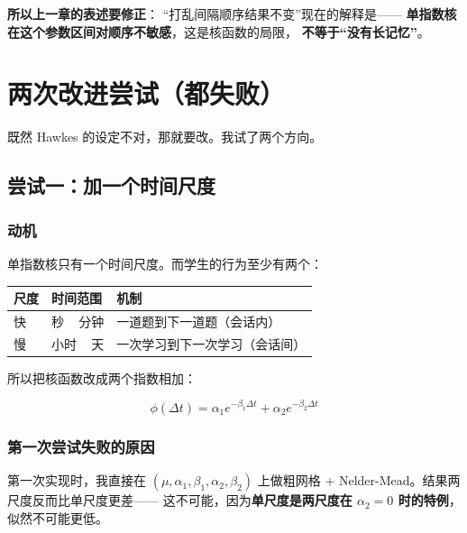 \documentclass[UTF8,a4paper,11pt]{ctexart}
\begin{document}
\textbf{所以上一章的表述要修正}：
“打乱间隔顺序结果不变”现在的解释是——
\textbf{单指数核在这个参数区间对顺序不敏感}，这是核函数的局限，
\textbf{不等于“没有长记忆”}。

\newpage

\section{两次改进尝试（都失败）}

既然 Hawkes 的设定不对，那就要改。我试了两个方向。

\subsection{尝试一：加一个时间尺度}

\subsubsection{动机}

单指数核只有一个时间尺度。而学生的行为至少有两个：

\begin{center}
\begin{tabular}{p{2.2cm}p{3.6cm}p{7.6cm}}
\toprule
\textbf{尺度} & \textbf{时间范围} & \textbf{机制} \\
\midrule
快 & 秒 ~ 分钟 & 一道题到下一道题（会话内） \\
慢 & 小时 ~ 天 & 一次学习到下一次学习（会话间） \\
\bottomrule
\end{tabular}
\end{center}

所以把核函数改成两个指数相加：

\begin{equation}
\phi(\Delta t) = \alpha_1 e^{-\beta_1 \Delta t} + \alpha_2 e^{-\beta_2 \Delta t}
\label{p2:eq:multiscale}
\end{equation}

\subsubsection{第一次尝试失败的原因}

第一次实现时，我直接在 $(\mu, \alpha_1, \beta_1, \alpha_2, \beta_2)$
上做粗网格 + Nelder-Mead。结果两尺度反而比单尺度更差——
这不可能，因为\textbf{单尺度是两尺度在 $\alpha_2=0$ 时的特例}，
似然不可能更低。
\end{document}
